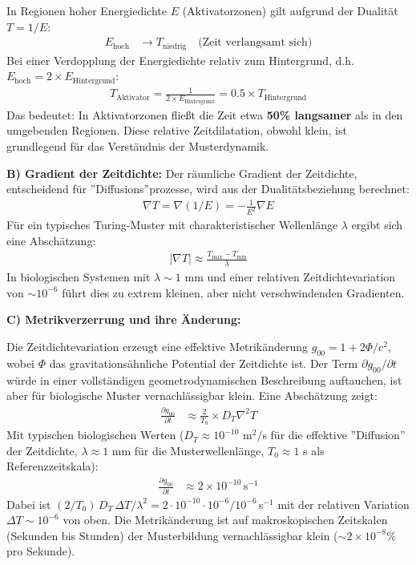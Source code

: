 In Regionen hoher Energiedichte $E$ (Aktivatorzonen) gilt aufgrund der Dualität $T = 1/E$:
\begin{align*}
	E_{\text{hoch}} &\rightarrow T_{\text{niedrig}} \quad \text{(Zeit verlangsamt sich)}
\end{align*}
Bei einer Verdopplung der Energiedichte relativ zum Hintergrund, d.h. $E_{\text{hoch}} = 2 \times E_{\text{Hintergrund}}$:
\begin{align*}
	T_{\text{Aktivator}} = \frac{1}{2 \times E_{\text{Hintergrund}}} = 0.5 \times T_{\text{Hintergrund}}
\end{align*}
Das bedeutet: In Aktivatorzonen fließt die Zeit etwa \textbf{50\% langsamer} als in den umgebenden Regionen. Diese relative Zeitdilatation, obwohl klein, ist grundlegend für das Verständnis der Musterdynamik.

\textbf{B) Gradient der Zeitdichte:}
Der räumliche Gradient der Zeitdichte, entscheidend für ''Diffusions''prozesse, wird aus der Dualitätsbeziehung berechnet:
\begin{align*}
	\nabla T = \nabla(1/E) = -\frac{1}{E^2} \nabla E
\end{align*}
Für ein typisches Turing-Muster mit charakteristischer Wellenlänge $\lambda$ ergibt sich eine Abschätzung:
\begin{align*}
	|\nabla T| \approx \frac{T_{\text{max}} - T_{\text{min}}}{\lambda}
\end{align*}
In biologischen Systemen mit $\lambda \sim 1$ mm und einer relativen Zeitdichtevariation von $\sim 10^{-6}$ führt dies zu extrem kleinen, aber nicht verschwindenden Gradienten.

\textbf{C) Metrikverzerrung und ihre Änderung:}

Die Zeitdichtevariation erzeugt eine effektive Metrikänderung $g_{00} = 1 + 2\Phi/c^2$, wobei $\Phi$ das gravitationsähnliche Potential der Zeitdichte ist. Der Term $\partial g_{00}/\partial t$ würde in einer vollständigen geometrodynamischen Beschreibung auftauchen, ist aber für biologische Muster vernachlässigbar klein. Eine Abschätzung zeigt:
\begin{align*}
	\frac{\partial g_{00}}{\partial t} &\approx \frac{2}{T_0} \times D_T \nabla^2 T
\end{align*}
Mit typischen biologischen Werten ($D_T \approx 10^{-10}$ m$^2$/s für die effektive ''Diffusion'' der Zeitdichte, $\lambda \approx 1$ mm für die Musterwellenlänge, $T_0 \approx 1$ s als Referenzzeitskala):
\begin{align*}
	\frac{\partial g_{00}}{\partial t} &\approx 2 \times 10^{-10} \, \text{s}^{-1}
\end{align*}
Dabei ist $(2/T_0)\,D_T\,\Delta T/\lambda^2 = 2 \cdot 10^{-10} \cdot 10^{-6}/10^{-6}$\,s$^{-1}$ mit der relativen Variation $\Delta T \sim 10^{-6}$ von oben.
Die Metrikänderung ist auf makroskopischen Zeitskalen (Sekunden bis Stunden) der Musterbildung vernachlässigbar klein ($\sim 2\times10^{-8}\%$ pro Sekunde).

